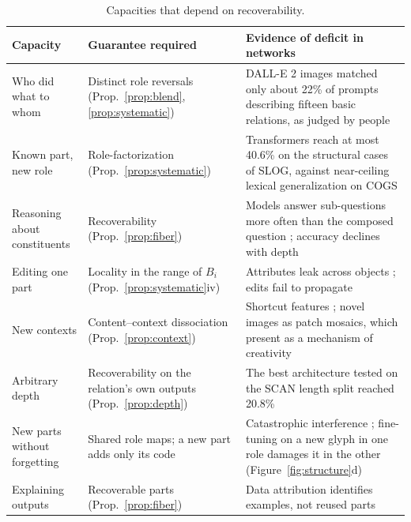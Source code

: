 \documentclass[10pt]{article}
\theoremstyle{plain}
\theoremstyle{remark}
\begin{document}
\begin{table}[h]
  \caption{Capacities that depend on recoverability.}
  \label{tab:cases}
  \centering\small
  \begin{tabularx}{\linewidth}{@{}P{3.4cm}P{4.4cm}Y@{}}
    \toprule
    Capacity & Guarantee required & Evidence of deficit in networks \\
    \midrule
    Who did what to whom & Distinct role reversals (Prop.~\ref{prop:blend}, \ref{prop:systematic}) & DALL-E 2 images matched only about 22\% of prompts describing fifteen basic relations, as judged by people \citep{conwell2022} \\
    Known part, new role & Role-factorization (Prop.~\ref{prop:systematic}) & Transformers reach at most 40.6\% on the structural cases of SLOG, against near-ceiling lexical generalization on COGS \citep{li2023slog} \\
    Reasoning about constituents & Recoverability (Prop.~\ref{prop:fiber}) & Models answer sub-questions more often than the composed question \citep{press2023}; accuracy declines with depth \citep{dziri2023} \\
    Editing one part & Locality in the range of $B_i$ (Prop.~\ref{prop:systematic}iv) & Attributes leak across objects \citep{rassin2022,huang2023t2i}; edits fail to propagate \citep{cohen2024} \\
    New contexts & Content--context dissociation (Prop.~\ref{prop:context}) & Shortcut features \citep{geirhos2020}; novel images as patch mosaics, which \citet{kamb2025} present as a mechanism of creativity \\
    Arbitrary depth & Recoverability on the relation's own outputs (Prop.~\ref{prop:depth}) & The best architecture tested on the SCAN length split reached 20.8\% \citep{lake2018} \\
    New parts without forgetting & Shared role maps; a new part adds only its code & Catastrophic interference \citep{mccloskey1989,french1999}; fine-tuning on a new glyph in one role damages it in the other (Figure~\ref{fig:structure}d) \\
    Explaining outputs & Recoverable parts (Prop.~\ref{prop:fiber}) & Data attribution identifies examples, not reused parts \citep{koh2017,grosse2023} \\
    \bottomrule
  \end{tabularx}
\end{table}
\end{document}
